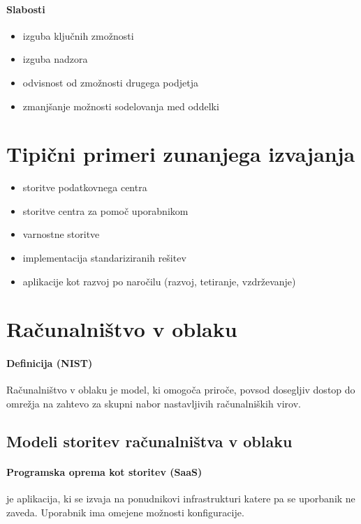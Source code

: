 \documentclass[a4paper,12pt]{report}
\begin{document}
      \paragraph{Slabosti}
         \begin{itemize}
            \item izguba ključnih zmožnosti
            \item izguba nadzora
            \item odvisnost od zmožnosti drugega podjetja
            \item zmanjšanje možnosti sodelovanja med oddelki
         \end{itemize}

      \section{Tipični primeri zunanjega izvajanja}
         \begin{itemize}
            \item storitve podatkovnega centra
            \item storitve centra za pomoč uporabnikom
            \item varnostne storitve
            \item implementacija standariziranih rešitev
            \item aplikacije kot razvoj po naročilu (razvoj, tetiranje, vzdrževanje)
         \end{itemize}

      \section{Računalništvo v oblaku}
         \paragraph{Definicija (NIST)} Računalništvo v oblaku je model, ki omogoča priroče, povsod dosegljiv dostop do omrežja na zahtevo za skupni nabor nastavljivih računalniških virov.

         \subsection{Modeli storitev računalništva v oblaku}
            \paragraph{Programska oprema kot storitev (SaaS)} je aplikacija, ki se izvaja na ponudnikovi infrastrukturi katere pa se uporbanik ne zaveda. Uporabnik ima omejene možnosti konfiguracije.
\end{document}
